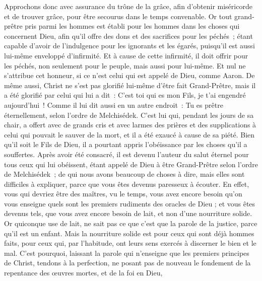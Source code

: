 \begin{multicols}{2}
Approchons donc avec assurance du trône de la grâce, afin d'obtenir miséricorde et de trouver grâce, pour être secourus dans le temps convenable.
\VerseOne{}Or tout grand-prêtre pris parmi les hommes est établi pour les hommes dans les choses qui concernent Dieu, afin qu'il offre des dons et des sacrifices pour les péchés~;
étant capable d'avoir de l'indulgence pour les ignorants et les égarés, puisqu'il est aussi lui-même enveloppé d'infirmité.
Et à cause de cette infirmité, il doit offrir pour les péchés, non seulement pour le peuple, mais aussi pour lui-même.
Et nul ne s'attribue cet honneur, si ce n'est celui qui est appelé de Dieu, comme Aaron.
De même aussi, Christ ne s'est pas glorifié lui-même d'être fait Grand-Prêtre, mais il a été glorifié par celui qui lui a dit~: C'est toi qui es mon Fils, je t'ai engendré aujourd'hui~!
Comme il lui dit aussi en un autre endroit~: Tu es prêtre éternellement, selon l'ordre de Melchisédek.
C'est lui qui, pendant les jours de sa chair, a offert avec de grands cris et avec larmes des prières et des supplications à celui qui pouvait le sauver de la mort, et il a été exaucé à cause de sa piété.
Bien qu'il soit le Fils de Dieu, il a pourtant appris l'obéissance par les choses qu'il a souffertes.
Après avoir été consacré, il est devenu l'auteur du salut éternel pour tous ceux qui lui obéissent,
étant appelé de Dieu à être Grand-Prêtre selon l'ordre de Melchisédek~;
de qui nous avons beaucoup de choses à dire, mais elles sont difficiles à expliquer, parce que vous êtes devenus  paresseux à écouter.
En effet, vous qui devriez être des maîtres, vu le temps, vous avez encore besoin qu'on vous enseigne quels sont les premiers rudiments des oracles de Dieu ; et vous êtes devenus tels, que vous avez encore besoin de lait, et non d’une nourriture solide.
Or quiconque use de lait, ne sait pas ce que c'est que la parole de la justice, parce qu'il est un enfant.
Mais la nourriture solide est pour ceux qui sont déjà hommes faits, pour ceux qui, par l'habitude, ont leurs sens exercés à discerner le bien et le mal.
\VerseOne{}C'est pourquoi, laissant la parole qui n'enseigne que les premiers principes de Christ, tendons à la perfection, ne posant pas de nouveau le fondement de la repentance des œuvres mortes, et de la foi en Dieu,

\end{multicols}
